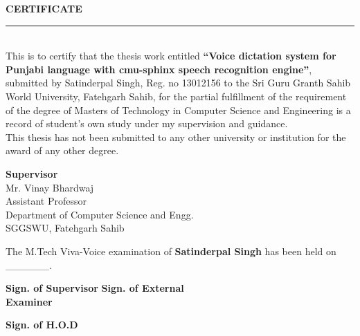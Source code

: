 \documentclass[12pt,a4paper,oldfontcommands]{memoir}
\newenvironment{certificate}%
    {\large\bfseries\centering CERTIFICATE%
    \par\medskip\normalfont\normalsize}%
    {}%
\begin{document}
\begin{certificate}
\noindent\rule{16cm}{1.0 pt} \\
\justify
This is to certify that the thesis work entitled \textbf{“Voice dictation system for Punjabi language with cmu-sphinx speech recognition engine”}, submitted by Satinderpal Singh, Reg. no 13012156 to the Sri Guru Granth Sahib World University, Fatehgarh Sahib, for the partial fulfillment of the requirement of the degree of Masters of Technology in Computer Science and Engineering is a record of student’s own study under my supervision and guidance. \\

This thesis has not been submitted to any other university or institution for the award of any other degree. \\
\vspace{3 cm}

\hfill \textbf{Supervisor}\\
\vspace{0 mm}
\hfill Mr. Vinay Bhardwaj \\
\vspace{0 mm}
\hfill Assistant Professor\\
\vspace{0 mm}
\hfill Department of Computer Science and Engg.\\
\vspace{0 mm}
\hfill SGGSWU, Fatehgarh Sahib\\
\vspace{2 cm}

The M.Tech Viva-Voice examination of \textbf{Satinderpal Singh} has been held on  \_\_\_\_\_\_. \\

\vspace{2 cm}

\noindent \textbf{Sign. of Supervisor}   \hfill \textbf{Sign. of External} \\
\noindent  \textbf{Examiner}  \\

\vspace{2 cm} 

\noindent  \textbf{Sign. of H.O.D} 

\end{certificate}

\end{document}
